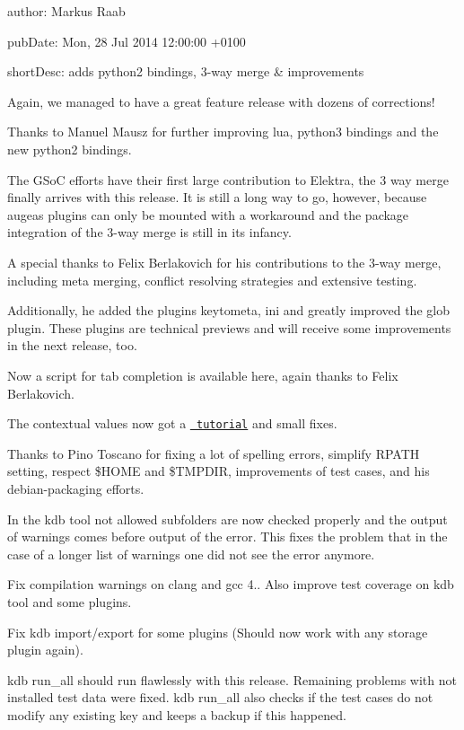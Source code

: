 
\begin{DoxyItemize}
\item author\+: Markus Raab
\item pub\+Date\+: Mon, 28 Jul 2014 12\+:00\+:00 +0100
\item short\+Desc\+: adds python2 bindings, 3-\/way merge \& improvements
\end{DoxyItemize}

Again, we managed to have a great feature release with dozens of corrections!

Thanks to Manuel Mausz for further improving lua, python3 bindings and the new python2 bindings.

The G\+SoC efforts have their first large contribution to Elektra, the 3 way merge finally arrives with this release. It is still a long way to go, however, because augeas plugins can only be mounted with a workaround and the package integration of the 3-\/way merge is still in its infancy.

A special thanks to Felix Berlakovich for his contributions to the 3-\/way merge, including meta merging, conflict resolving strategies and extensive testing.

Additionally, he added the plugins keytometa, ini and greatly improved the glob plugin. These plugins are technical previews and will receive some improvements in the next release, too.

Now a script for tab completion is available here, again thanks to Felix Berlakovich.

The contextual values now got a \href{https://master.libelektra.org/src/tools/pythongen}{\texttt{ tutorial}} and small fixes.

Thanks to Pino Toscano for fixing a lot of spelling errors, simplify R\+P\+A\+TH setting, respect \$\+H\+O\+ME and \$\+T\+M\+P\+D\+IR, improvements of test cases, and his debian-\/packaging efforts.

In the kdb tool not allowed subfolders are now checked properly and the output of warnings comes before output of the error. This fixes the problem that in the case of a longer list of warnings one did not see the error anymore.

Fix compilation warnings on clang and gcc 4.. Also improve test coverage on kdb tool and some plugins.

Fix kdb import/export for some plugins (Should now work with any storage plugin again).

kdb run\+\_\+all should run flawlessly with this release. Remaining problems with not installed test data were fixed. kdb run\+\_\+all also checks if the test cases do not modify any existing key and keeps a backup if this happened.


